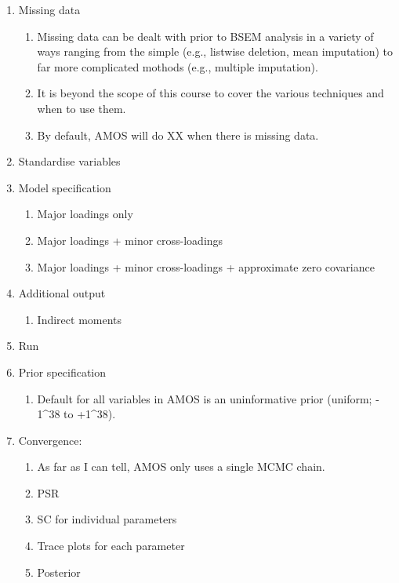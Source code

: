 \documentclass[
  a4paper,
  DIV=11,
  numbers=noendperiod]{scrreprt}
\providecommand{\tightlist}{%
  \setlength{\itemsep}{0pt}\setlength{\parskip}{0pt}}\usepackage{longtable,booktabs,array}
\begin{document}
\begin{enumerate}
\def\labelenumi{\arabic{enumi}.}
\tightlist
\item
  Missing data

  \begin{enumerate}
  \def\labelenumii{\arabic{enumii}.}
  \tightlist
  \item
    Missing data can be dealt with prior to BSEM analysis in a variety
    of ways ranging from the simple (e.g., listwise deletion, mean
    imputation) to far more complicated mothods (e.g., multiple
    imputation).
  \item
    It is beyond the scope of this course to cover the various
    techniques and when to use them.
  \item
    By default, AMOS will do XX when there is missing data.
  \end{enumerate}
\item
  Standardise variables
\item
  Model specification

  \begin{enumerate}
  \def\labelenumii{\arabic{enumii}.}
  \tightlist
  \item
    Major loadings only
  \item
    Major loadings + minor cross-loadings
  \item
    Major loadings + minor cross-loadings + approximate zero covariance
  \end{enumerate}
\item
  Additional output

  \begin{enumerate}
  \def\labelenumii{\arabic{enumii}.}
  \tightlist
  \item
    Indirect moments
  \end{enumerate}
\item
  Run
\item
  Prior specification

  \begin{enumerate}
  \def\labelenumii{\arabic{enumii}.}
  \tightlist
  \item
    Default for all variables in AMOS is an uninformative prior
    (uniform; - 1\^{}38 to +1\^{}38).
  \end{enumerate}
\item
  Convergence:

  \begin{enumerate}
  \def\labelenumii{\arabic{enumii}.}
  \tightlist
  \item
    As far as I can tell, AMOS only uses a single MCMC chain.
  \item
    PSR
  \item
    SC for individual parameters
  \item
    Trace plots for each parameter
  \item
    Posterior


\end{enumerate}
\end{enumerate}
\end{document}
